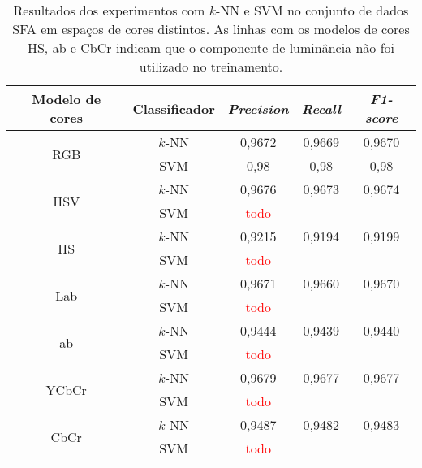 \begin{table}[!htpb]
\centering
\begin{small}
\setlength{\tabcolsep}{8pt}

\begin{tabular}{|c|c|c|c|c|}\hline
 Modelo de cores & Classificador & \emph{Precision} & \emph{Recall} & \emph{F1-score} \\ \hline
 \multirow{2}{*}{RGB}   & $k$-NN  & 0,9672 & 0,9669 & 0,9670 \\ \cline{2-5}
                        & SVM     & 0,98 & 0,98 & 0,98 \\ \hline
 \multirow{2}{*}{HSV}   & $k$-NN  & 0,9676 & 0,9673 & 0,9674 \\ \cline{2-5}
                        & SVM     & \textcolor{red}{todo} && \\ \hline
 \multirow{2}{*}{HS}    & $k$-NN  & 0,9215 & 0,9194 & 0,9199 \\ \cline{2-5}
                        & SVM     & \textcolor{red}{todo} && \\ \hline
 \multirow{2}{*}{Lab}   & $k$-NN  & 0,9671 & 0,9660 & 0,9670 \\ \cline{2-5}
                        & SVM     & \textcolor{red}{todo} && \\ \hline
 \multirow{2}{*}{ab}    & $k$-NN  & 0,9444 & 0,9439 & 0,9440 \\ \cline{2-5}
                        & SVM     & \textcolor{red}{todo} && \\ \hline
 \multirow{2}{*}{YCbCr} & $k$-NN  & 0,9679 & 0,9677 & 0,9677 \\ \cline{2-5}
                        & SVM     & \textcolor{red}{todo} && \\ \hline
 \multirow{2}{*}{CbCr}  & $k$-NN  & 0,9487 & 0,9482 & 0,9483 \\ \cline{2-5}
                        & SVM     & \textcolor{red}{todo} && \\ \hline

\end{tabular}
\end{small}
\caption[Resultados dos experimentos com $k$-NN e SVM no conjunto de dados SFA em espaços de cores distintos]{Resultados dos experimentos com $k$-NN e SVM no conjunto de dados SFA em espaços de cores distintos. As linhas com os modelos de cores HS, ab e CbCr indicam que o componente de luminância não foi utilizado no treinamento.}
\label{tab:resultados_experimento_dois}
\end{table}


